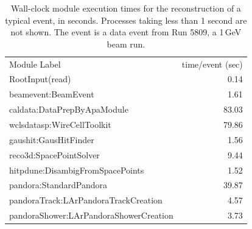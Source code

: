 \documentclass[../main-v1.tex]{subfiles}
\begin{document}
\begin{longtable}
{l r}
\caption[Processing time for reconstruction modules for a  event]{Wall-clock module execution times for the reconstruction of a typical  event, in seconds.  Processes taking less than 1 second are not shown. The event is a data event from Run 5809, a 1\,GeV beam run.} \\ \toprowrule
  \rowcolor{dunesky}
Module Label & time/event (sec)\\ \toprowrule
RootInput(read)                          &     0.14\\%
beamevent:BeamEvent                      &      1.61\\%
caldata:DataPrepByApaModule              &      83.03\\%
wclsdatasp:WireCellToolkit               &      79.86\\%
gaushit:GausHitFinder                    &      1.56\\%
reco3d:SpacePointSolver                  &      9.44\\%
hitpdune:DisambigFromSpacePoints         &      1.52\\%
pandora:StandardPandora                  &      39.87\\%
pandoraTrack:LArPandoraTrackCreation     &      4.57\\%
pandoraShower:LArPandoraShowerCreation   &      3.73\\%

\end{longtable}
\end{document}
